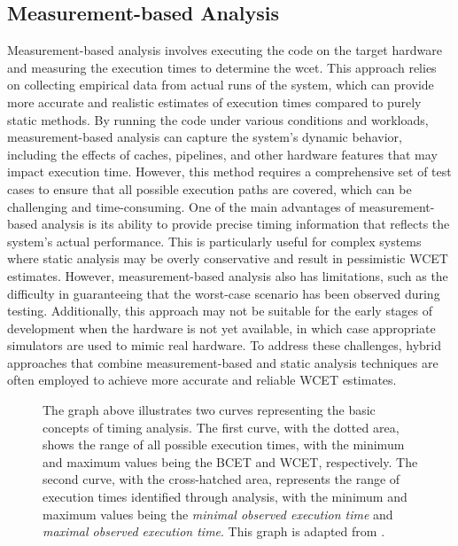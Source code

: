 \subsection{Measurement-based Analysis}\label{sec:measurement_analysis}
Measurement-based analysis involves executing the code on the target hardware and measuring the execution times to determine the \ac{wcet}.
This approach relies on collecting empirical data from actual runs of the system, which can provide more accurate and realistic estimates of execution times compared to purely static methods.
By running the code under various conditions and workloads, measurement-based analysis can capture the system's dynamic behavior, including the effects of caches, pipelines, and other hardware features that may impact execution time.
However, this method requires a comprehensive set of test cases to ensure that all possible execution paths are covered, which can be challenging and time-consuming\cite{wilhelmWorstcaseExecutiontimeProblem2008}.
One of the main advantages of measurement-based analysis is its ability to provide precise timing information that reflects the system's actual performance.
This is particularly useful for complex systems where static analysis may be overly conservative and result in pessimistic WCET estimates.
However, measurement-based analysis also has limitations, such as the difficulty in guaranteeing that the worst-case scenario has been observed during testing.
Additionally, this approach may not be suitable for the early stages of development when the hardware is not yet available, in which case appropriate simulators are used to mimic real hardware.\cite{wilhelmWorstcaseExecutiontimeProblem2008}
To address these challenges, hybrid approaches that combine measurement-based and static analysis techniques are often employed to achieve more accurate and reliable WCET estimates\cite{kelterWCETAnalysisOptimization}.

\begin{figure}[htbp]
	\centering
	\resizebox{\textwidth}{!}{
		
	}
	\caption{
		The graph above illustrates two curves representing the basic concepts of timing analysis.
		The first curve, with the dotted area, shows the range of all possible execution times, with the minimum and maximum values being the \ac{BCET} and \ac{WCET}, respectively.
		The second curve, with the cross-hatched area, represents the range of execution times identified through analysis, with the minimum and maximum values being the \textit{minimal observed execution time} and \textit{maximal observed execution time}.
		This graph is adapted from \textcite{wilhelmWorstcaseExecutiontimeProblem2008}.
	}
	\label{fig:overestimation}
\end{figure}

